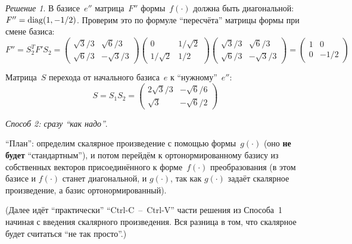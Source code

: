 \documentclass[a4paper,12pt]{article}
\theoremstyle{remark}
\newtheorem*{finalsolution}{Решение}
\begin{document}
\begin{finalsolution}
    В базисе~$e''$ матрица~$F''$ формы~$f(\cdot)$ должна быть диагональной: $F'' \hm= \diag(1, -1/2)$.
    Проверим это по формуле ``пересчёта'' матрицы формы при смене базиса:
    \[
      F'' = S_2^T F' S_2 = \begin{pmatrix}
        \sqrt{3} \big/ 3 & \sqrt{6} \big/ 3\\
        \sqrt{6} \big/ 3 & -\sqrt{3} \big/ 3
      \end{pmatrix}
      \begin{pmatrix}
        0                & 1 \big/ \sqrt{2}\\
        1 \big/ \sqrt{2} & 1/2
      \end{pmatrix}
      \begin{pmatrix}
        \sqrt{3} \big/ 3 & \sqrt{6} \big/ 3\\
        \sqrt{6} \big/ 3 & -\sqrt{3} \big/ 3
      \end{pmatrix}
      = \begin{pmatrix}
        1 & 0\\
        0 & -1/2
      \end{pmatrix}
    \]
    
    Матрица~$S$ перехода от начального базиса~$e$ к ``нужному''~$e''$:
    \[
      S = S_1 S_2 = \begin{pmatrix}
        2 \sqrt{3} \big/ 3 & -\sqrt{6} \big/ 6\\
        \sqrt{3}           & -\sqrt{6} \big/ 2
      \end{pmatrix}
    \]
  
    \medskip
    
    \emph{Способ 2: сразу ``как надо''}.
    
    ``План'': определим скалярное произведение с помощью формы~$g(\cdot)$ (оно \textbf{не будет} ``стандартным''), и потом перейдём к ортонормированному базису из собственных векторов присоединённого к форме~$f(\cdot)$ преобразования (в этом базисе и $f(\cdot)$ станет диагональной, и $g(\cdot)$, так как $g(\cdot)$ задаёт скалярное произведение, а базис ортонормированный).
    
    (Далее идёт ``практически'' ``Ctrl-C~--~Ctrl-V'' части решения из Способа~1 начиная с введения скалярного произведения.
    Вся разница в том, что скалярное будет считаться ``не так просто''.)


\end{finalsolution}
\end{document}
